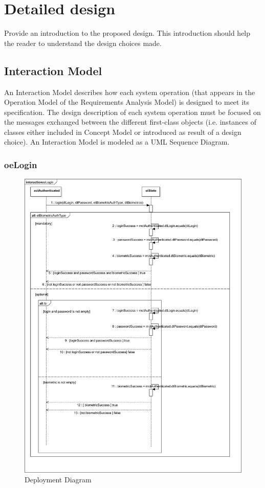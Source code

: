 \chapter{Detailed design}
\label{chap:detDesign}


Provide an introduction to the proposed design. This introduction should help
the reader to understand the design choices made.


\section{Interaction Model}
An Interaction Model describes how each \gls{system operation} (that appears in the
Operation Model of the \msrmessir Requirements Analysis Model) is designed to meet
its specification. The design description of each system operation must be
focused on the messages exchanged between the different first-class objects
(i.e. instances of classes either included in Concept Model or introduced as
result of a design choice). An Interaction Model is modeled as a UML Sequence
Diagram.

% 
 \subsection{oeLogin}
 
 \begin{figure}[H]
	\begin{center}
	  \includegraphics[width=450px]{images/design/login.eps}
	  \caption{Deployment Diagram}
	  \label{fig:deploy-diagram}
	\end{center}
\end{figure}


